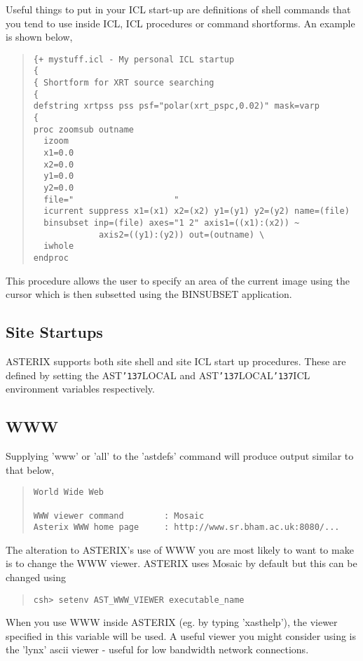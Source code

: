 \documentclass{book}
\renewcommand{\_}{{\tt\char'137}}     %
\begin{document}
Useful things to put in your ICL start-up are definitions of shell
commands that you tend to use inside ICL, ICL procedures or command
shortforms. An example is shown below,

\begin{quote}\begin{verbatim}
{+ mystuff.icl - My personal ICL startup
{
{ Shortform for XRT source searching
{
defstring xrtpss pss psf="polar(xrt_pspc,0.02)" mask=varp
{
proc zoomsub outname
  izoom
  x1=0.0
  x2=0.0
  y1=0.0
  y2=0.0
  file="                    "
  icurrent suppress x1=(x1) x2=(x2) y1=(y1) y2=(y2) name=(file)
  binsubset inp=(file) axes="1 2" axis1=((x1):(x2)) ~
             axis2=((y1):(y2)) out=(outname) \
  iwhole
endproc
\end{verbatim}\end{quote}
This procedure allows the user to specify an area of the current
image using the cursor which is then subsetted using the BINSUBSET
application.

\subsection{Site Startups}
ASTERIX supports both site shell and site ICL start up procedures.
These are defined by setting the AST\_LOCAL and AST\_LOCAL\_ICL
environment variables respectively.

\subsection{WWW}
Supplying 'www' or 'all' to the 'astdefs' command will produce output
similar to that below,

\begin{quote}\begin{verbatim}
World Wide Web

WWW viewer command        : Mosaic
Asterix WWW home page     : http://www.sr.bham.ac.uk:8080/...
\end{verbatim}\end{quote}
The alteration to ASTERIX's use of WWW you are most likely to want
to make is to change the WWW viewer. ASTERIX uses Mosaic by default
but this can be changed using
\begin{quote}\begin{verbatim}
csh> setenv AST_WWW_VIEWER executable_name
\end{verbatim}\end{quote}
When you use WWW inside ASTERIX (eg. by typing 'xasthelp'), the
viewer specified in this variable will be used. A useful viewer
you might consider using is the 'lynx' ascii viewer - useful for
low bandwidth network connections.
\end{document}
